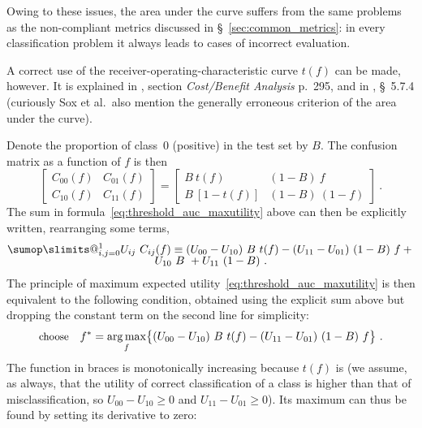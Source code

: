 \documentclass[\ifafour a4paper,12pt,\else a5paper,10pt,\fi%
onecolumn,oneside,article,%
british%
]{memoir}
\makeatletter
\theoremstyle{remark}
\theoremstyle{innote}
\def\sum{\DOTSI\sumop\slimits@}
\renewcommand*{\ge}{\geqslant}%
\DeclarePairedDelimiter\set{\{}{\}} %
\renewcommand*{\|}[1][]{\nonscript\:#1\vert\nonscript\:\mathopen{}}
\newcommand*{\sect}{\S}%
\newcommand*{\etal}{{et al.}}
\DeclareMathOperator*{\argmax}{arg\,max}
\makeatother
\begin{document}
Owing to these issues, the area under the curve suffers from the same problems as the non-compliant metrics discussed in \sect~\ref{sec:common_metrics}: in every classification problem it always leads to cases of incorrect evaluation.

A correct use of the receiver-operating-characteristic curve $t(f)$ can be made, however. It is explained in \textcite{metz1978}, section \emph{Cost/Benefit Analysis} p.~295, and in \textcites{soxetal1988_r2013}, \sect~5.7.4 (curiously Sox \etal\ also mention the generally erroneous criterion of the area under the curve).

Denote the proportion of class~$0$ (positive) in the test set by $B$. The confusion matrix as a function of $f$ is then
\begin{equation}
  \label{eq:CM_fromrates}
  \begin{bmatrix}
    C_{00}(f) & C_{01}(f)\\ C_{10}(f) & C_{11}(f)
  \end{bmatrix}
  =
  \begin{bmatrix}
    B\ t(f) & (1-B)\ f \\ B\ [1-t(f)] &(1-B)\ (1-f)
  \end{bmatrix} \ .
\end{equation}
The sum in formula~\eqref{eq:threshold_auc_maxutility} above can then be explicitly written, rearranging some terms,
\begin{multline}
  \label{eq:sum_UC}
  \sum_{i,j=0}^{1} U_{ij}\ C_{ij}(f) \equiv
      (U_{00} - U_{10})\  B\ t(f) -
    (U_{11} - U_{01})\ (1-B)\ f
    +{}\\[-2\jot]
    U_{10}\ B\ + U_{11}\ (1-B) \ .
\end{multline}
The principle of maximum expected utility~\eqref{eq:threshold_auc_maxutility} is  then equivalent to the following condition, obtained using the explicit sum above but dropping the constant term on the second line for simplicity:
\begin{equation}
  \label{eq:threshold_auc_maxutility_rates}
  \text{\small choose}\quad
  f^{*} = \argmax_{f}\set[\big]{
    (U_{00} - U_{10})\  B\ t(f) -
    (U_{11} - U_{01})\ (1-B)\ f
} \ .
  \end{equation}
The function in braces is monotonically increasing because $t(f)$ is (we assume, as always, that the utility of correct classification of a class is higher than that of misclassification, so $U_{00}-U_{10} \ge 0$ and $U_{11}-U_{01} \ge 0$). Its maximum can thus be found by setting its derivative to zero:
\end{document}
